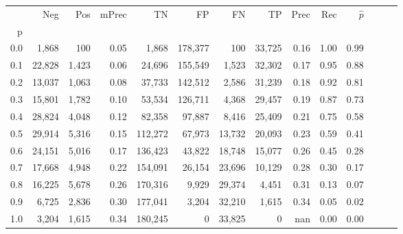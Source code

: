 \begin{tabular}{rrrrrrrrrrrrrr}
\toprule
{} &     Neg &    Pos & mPrec &       TN &       FP &      FN &      TP &  Prec &   Rec & $\hat{p}$ \\
p   &         &        &       &          &          &         &         &       &       &           \\
\midrule
0.0 &   1,868 &    100 &  0.05 &    1,868 &  178,377 &     100 &  33,725 &  0.16 &  1.00 &      0.99 \\
0.1 &  22,828 &  1,423 &  0.06 &   24,696 &  155,549 &   1,523 &  32,302 &  0.17 &  0.95 &      0.88 \\
0.2 &  13,037 &  1,063 &  0.08 &   37,733 &  142,512 &   2,586 &  31,239 &  0.18 &  0.92 &      0.81 \\
0.3 &  15,801 &  1,782 &  0.10 &   53,534 &  126,711 &   4,368 &  29,457 &  0.19 &  0.87 &      0.73 \\
0.4 &  28,824 &  4,048 &  0.12 &   82,358 &   97,887 &   8,416 &  25,409 &  0.21 &  0.75 &      0.58 \\
0.5 &  29,914 &  5,316 &  0.15 &  112,272 &   67,973 &  13,732 &  20,093 &  0.23 &  0.59 &      0.41 \\
0.6 &  24,151 &  5,016 &  0.17 &  136,423 &   43,822 &  18,748 &  15,077 &  0.26 &  0.45 &      0.28 \\
0.7 &  17,668 &  4,948 &  0.22 &  154,091 &   26,154 &  23,696 &  10,129 &  0.28 &  0.30 &      0.17 \\
0.8 &  16,225 &  5,678 &  0.26 &  170,316 &    9,929 &  29,374 &   4,451 &  0.31 &  0.13 &      0.07 \\
0.9 &   6,725 &  2,836 &  0.30 &  177,041 &    3,204 &  32,210 &   1,615 &  0.34 &  0.05 &      0.02 \\
1.0 &   3,204 &  1,615 &  0.34 &  180,245 &        0 &  33,825 &       0 &   nan &  0.00 &      0.00 \\
\bottomrule
\end{tabular}
